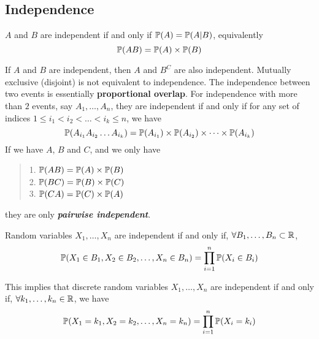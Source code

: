 \subsection{Independence}
\begin{definition}
    $A$ and $B$ are independent if and only if $\mathbb{P}(A) = \mathbb{P}(A|B)$, equivalently
    $$\mathbb{P}(AB) = \mathbb{P}(A) \times \mathbb{P}(B)$$
\end{definition}
If $A$ and $B$ are independent, then $A$ and $B^C$ are also independent. Mutually exclusive (disjoint) is not equivalent to independence. The independence between two events is essentially \textbf{proportional overlap}. For independence with more than $2$ events, say $A_1, \dots, A_n$, they are independent if and only if for any set of indices $1 \le i_1 < i_2 < \dots < i_k \le n$, we have
$$\mathbb{P}(A_{i_1}A_{i_2}\dots A_{i_k}) = \mathbb{P}(A_{i_1}) \times \mathbb{P}(A_{i_2}) \times \dots \times \mathbb{P}(A_{i_k})$$
If we have $A$, $B$ and $C$, and we only have
\begin{quote}
    1. $\mathbb{P}(AB) = \mathbb{P}(A) \times \mathbb{P}(B)$ \\
    2. $\mathbb{P}(BC) = \mathbb{P}(B) \times \mathbb{P}(C)$ \\
    3. $\mathbb{P}(CA) = \mathbb{P}(C) \times \mathbb{P}(A)$
\end{quote}
they are only \textbf{\textit{pairwise independent}}.
\begin{definition}
    Random variables $X_1, \dots, X_n$ are independent if and only if, $\forall B_1, \dots, B_n \subset \mathbb{R}$,
    $$\mathbb{P}(X_1 \in B_1, X_2 \in B_2, \dots, X_n \in B_n) = \prod_{i = 1}^{n} \mathbb{P}(X_i \in B_i)$$
\end{definition}
This implies that discrete random variables $X_1, \dots, X_n$ are independent if and only if, $\forall k_1, \dots, k_n \in \mathbb{R}$, we have
$$\mathbb{P}(X_1 = k_1, X_2 = k_2, \dots, X_n = k_n) = \prod_{i = 1}^{n} \mathbb{P}(X_i = k_i)$$

